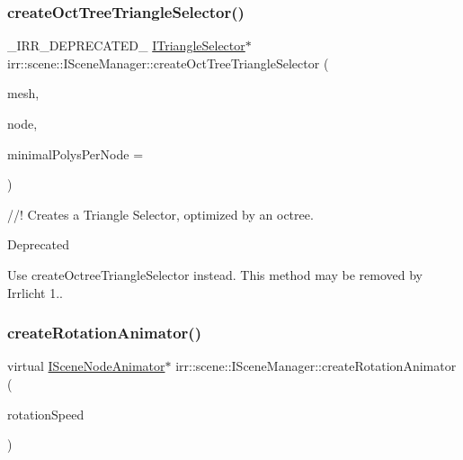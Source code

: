 \subsubsection{\texorpdfstring{create\+Oct\+Tree\+Triangle\+Selector()}{createOctTreeTriangleSelector()}\hspace{0.1cm}{\footnotesize\ttfamily [2/2]}}
{\footnotesize\ttfamily \+\_\+\+I\+R\+R\+\_\+\+D\+E\+P\+R\+E\+C\+A\+T\+E\+D\+\_\+ \hyperlink{classirr_1_1scene_1_1ITriangleSelector}{I\+Triangle\+Selector}$\ast$ irr\+::scene\+::\+I\+Scene\+Manager\+::create\+Oct\+Tree\+Triangle\+Selector (\begin{DoxyParamCaption}\item[{\hyperlink{classirr_1_1scene_1_1IMesh}{I\+Mesh} $\ast$}]{mesh,  }\item[{\hyperlink{classirr_1_1scene_1_1ISceneNode}{I\+Scene\+Node} $\ast$}]{node,  }\item[{\hyperlink{namespaceirr_ac66849b7a6ed16e30ebede579f9b47c6}{s32}}]{minimal\+Polys\+Per\+Node = {} }\end{DoxyParamCaption})\hspace{0.3cm}{\ttfamily [inline]}}



//! Creates a Triangle Selector, optimized by an octree. 

\begin{DoxyRefDesc}{Deprecated}
\item[\hyperlink{deprecated__deprecated000046}{Deprecated}]Use create\+Octree\+Triangle\+Selector instead. This method may be removed by Irrlicht 1.. \end{DoxyRefDesc}
\mbox{\label{classirr_1_1scene_1_1ISceneManager_a29efe9505de4e5dc2218283ef0c2a64d}} 
\subsubsection{\texorpdfstring{create\+Rotation\+Animator()}{createRotationAnimator()}\hspace{0.1cm}{\footnotesize\ttfamily [1/2]}}
{\footnotesize\ttfamily virtual \hyperlink{classirr_1_1scene_1_1ISceneNodeAnimator}{I\+Scene\+Node\+Animator}$\ast$ irr\+::scene\+::\+I\+Scene\+Manager\+::create\+Rotation\+Animator (\begin{DoxyParamCaption}\item[{const \hyperlink{namespaceirr_1_1core_ae6e2b2a6c552833ebbd5b7463d03586b}{core\+::vector3df} \&}]{rotation\+Speed }\end{DoxyParamCaption})\hspace{0.3cm}{\ttfamily [pure virtual]}}



